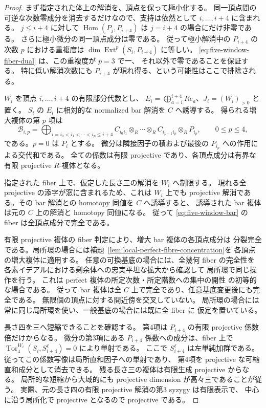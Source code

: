 \begin{proof}
まず指定された体上の解消を、頂点を保って極小化する。
同一頂点間の可逆な次数零成分を消去するだけなので、支持は依然として
$i,\ldots,i+4$ に含まれる。
$j\le i+4$ に対して
$\operatorname{Hom}(P_j,P_{i+4})$ は $j=i+4$ の場合にだけ非零である。
さらに極小微分の同一頂点成分は零である。
従って極小解消中の $P_{i+4}$ の次数 $p$ における重複度は
$\dim\operatorname{Ext}^p(S_i,P_{i+4})$ に等しい。
\eqref{eq:five-window-fiber-dual} は、この重複度が $p=3$ で一、
それ以外で零であることを保証する。
特に低い解消次数にも $P_{i+4}$ が現れ得る、という可能性はここで排除される。

$W_i$ を頂点 $i,\ldots,i+4$ の有限部分代数とし、
$E_i=\bigoplus_{a=i}^{i+4}Re_a$、$J_i=(W_i)_{>0}$ と置く。
$S_i$ の $E_i$ に相対的な normalized bar 解消を $C$ へ誘導する。
得られる増大複体の第 $p$ 項は
\[
 \mathcal B_{i,p}=
 \bigoplus_{i=i_0<i_1<\cdots<i_p\le i+4}
 C_{i_0i_1}\otimes_R\cdots\otimes_R C_{i_{p-1}i_p}
       \otimes_RP_{i_p},\qquad 0\le p\le4,
 \tag{BW-bar}\label{eq:five-window-bar}
\]
である。$p=0$ は $P_i$ とする。
微分は隣接因子の積および最後の $P_{i_p}$ への作用による交代和である。
全ての係数は有限 projective であり、各頂点成分は有界な有限 projective
$R$-複体となる。

指定された fiber 上で、仮定した長さ三の解消を $W_i$ へ制限する。
現れる全 projective の添字が窓に含まれるため、これは $W_i$ 上でも
projective 解消である。その bar 解消との homotopy 同値を $C$ へ誘導すると、
誘導された bar 複体は元の $C$ 上の解消と homotopy 同値になる。
従って \eqref{eq:five-window-bar} の fiber は全頂点成分で完全である。

有限 projective 複体の fiber 判定により、増大 bar 複体の各頂点成分は
分裂完全である。局所環の場合には補題~\ref{lem:local-perfect-fibre-concentration}を
各頂点の増大複体に適用する。
任意の可換基底の場合には、全幾何 fiber の完全性を
各素イデアルにおける剰余体への忠実平坦な拡大から確認して
局所環で同じ操作を行う。
これは perfect 複体の所定次数・所定階数への集中の開性
\cite[Tag 0BDK, Lemma 36.31.3]{StacksPerfectFibers}
の初等的な場合である。
従って bar 複体は全 $C$ 上で完全であり、任意基底変更後にも完全である。
無限個の頂点に対する開近傍を交叉していない。
局所環の場合には常に同じ局所環を使い、一般基底の場合には既に全 fiber に
仮定を置いている。

長さ四を三へ短縮できることを確認する。
第4項は $P_{i+4}$ の有限 projective 係数倍だけからなる。
微分の第3項にある $P_{i+4}$ 係数への成分は、fiber 上で
$\operatorname{Tor}^{W_i}_4(S_i,S_{i+4}^{\ell})=0$ により単射である。
ここで $S_{i+4}^{\ell}$ は左単純加群である。
従ってこの係数写像は局所直和因子への単射であり、
第4項を projective な可縮直和成分として消去できる。
残る長さ三の複体は有限生成 projective からなる。
局所的な短縮から大域的にも projective dimension が高々三であることが従う。
実際、元の長さ四の有限 projective 解消の第3 syzygy は有限表示で、
中心に沿う局所化で projective となるので projective である。


\end{proof}
